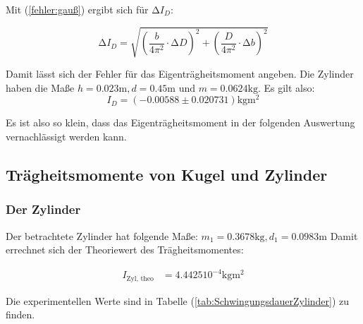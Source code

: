 Mit (\ref{fehler:gauß}) ergibt sich  für $\increment I_{D}$:

\begin{equation*}
  \increment I_{D} = \sqrt{\left(\frac{b}{4 \pi^2} \cdot  \increment D\right)^2 + \left(\frac{D}{4 \pi^2} \cdot  \increment b\right)^2}
\end{equation*}


Damit lässt sich der Fehler für das Eigenträgheitsmoment angeben.
Die Zylinder haben die Maße $h = 0.023 \unit{\meter}, d = 0.45 \unit{\meter} \text{ und } m = 0.0624 \unit{\kilo\gram}$.
Es gilt also:
\begin{equation*}
  I_{D} =  (-0.00588 \pm 0.020731) \unit{\kilo\gram\meter\squared}
\end{equation*}

Es ist also so klein, dass das Eigenträgheitsmoment in der folgenden Auswertung vernachlässigt werden kann.


\subsection{Trägheitsmomente von Kugel und Zylinder}
\label{sec:KugelundZylinder}

\subsubsection*{Der Zylinder}
Der betrachtete Zylinder hat folgende Maße: $m_1 = 0.3678 \unit{\kilo\gram}, d_1 = 0.0983 \unit{\meter}$
Damit errechnet sich der Theoriewert des Trägheitsmomentes:

\begin{align*}
  I_{\text{Zyl, theo}} &= 4.4425 10^{-4} \unit{\kilo\gram\meter\squared}
\end{align*}

Die experimentellen Werte sind in Tabelle (\ref{tab:SchwingungsdauerZylinder}) zu finden.


